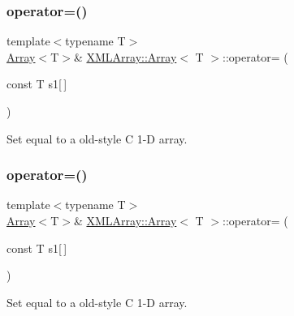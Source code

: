\subsubsection{\texorpdfstring{operator=()}{operator=()}\hspace{0.1cm}{\footnotesize\ttfamily [5/6]}}
{\footnotesize\ttfamily template$<$typename T$>$ \\
\mbox{\hyperlink{classXMLArray_1_1Array}{Array}}$<$T$>$\& \mbox{\hyperlink{classXMLArray_1_1Array}{X\+M\+L\+Array\+::\+Array}}$<$ T $>$\+::operator= (\begin{DoxyParamCaption}\item[{const T}]{s1\mbox{[}$\,$\mbox{]} }\end{DoxyParamCaption})\hspace{0.3cm}{\ttfamily [inline]}}



Set equal to a old-\/style C 1-\/D array. 

\mbox{\label{classXMLArray_1_1Array_a73e85fb91d2c802400fa356bc3ce77e1}} 
\subsubsection{\texorpdfstring{operator=()}{operator=()}\hspace{0.1cm}{\footnotesize\ttfamily [6/6]}}
{\footnotesize\ttfamily template$<$typename T$>$ \\
\mbox{\hyperlink{classXMLArray_1_1Array}{Array}}$<$T$>$\& \mbox{\hyperlink{classXMLArray_1_1Array}{X\+M\+L\+Array\+::\+Array}}$<$ T $>$\+::operator= (\begin{DoxyParamCaption}\item[{const T}]{s1\mbox{[}$\,$\mbox{]} }\end{DoxyParamCaption})\hspace{0.3cm}{\ttfamily [inline]}}



Set equal to a old-\/style C 1-\/D array. 

\mbox{\label{classXMLArray_1_1Array_a42dbfab67d875b6fa456cade78f70f8f}} 
